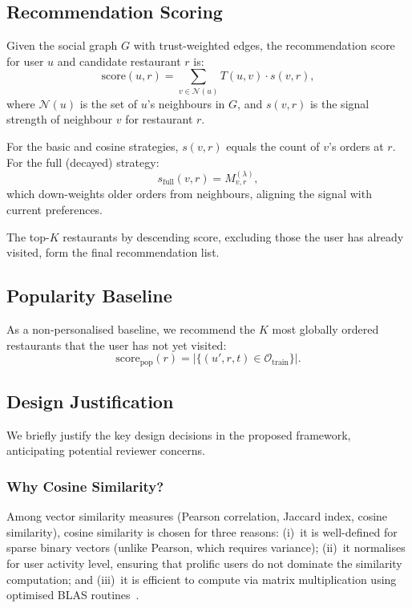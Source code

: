 \documentclass[conference]{IEEEtran}
\begin{document}
\subsection{Recommendation Scoring}
Given the social graph $G$ with trust-weighted edges, the recommendation
score for user $u$ and candidate restaurant $r$ is:
\begin{equation}
  \text{score}(u, r) = \sum_{v \in \mathcal{N}(u)} T(u, v) \cdot
    s(v, r),
  \label{eq:score}
\end{equation}
where $\mathcal{N}(u)$ is the set of $u$'s neighbours in $G$, and
$s(v, r)$ is the signal strength of neighbour $v$ for restaurant $r$.

For the basic and cosine strategies, $s(v, r)$ equals the count of $v$'s
orders at $r$.  For the full (decayed) strategy:
\begin{equation}
  s_{\text{full}}(v, r) = M^{(\lambda)}_{v,r},
  \label{eq:signal_full}
\end{equation}
which down-weights older orders from neighbours, aligning the signal with
current preferences.

The top-$K$ restaurants by descending score, excluding those the user has
already visited, form the final recommendation list.

\subsection{Popularity Baseline}
As a non-personalised baseline, we recommend the $K$ most globally
ordered restaurants that the user has not yet visited:
\begin{equation}
  \text{score}_{\text{pop}}(r) = \bigl|\{(u', r, t) \in
    \mathcal{O}_{\text{train}}\}\bigr|.
  \label{eq:popularity}
\end{equation}

\subsection{Design Justification}
\label{sec:justification}

We briefly justify the key design decisions in the proposed framework,
anticipating potential reviewer concerns.

\subsubsection{Why Cosine Similarity?}
Among vector similarity measures (Pearson correlation, Jaccard index,
cosine similarity), cosine similarity is chosen for three reasons:
(i)~it is well-defined for sparse binary vectors (unlike Pearson, which
requires variance); (ii)~it normalises for user activity level, ensuring
that prolific users do not dominate the similarity computation; and
(iii)~it is efficient to compute via matrix multiplication using
optimised BLAS routines~\cite{sarwar2001item}.
\end{document}
